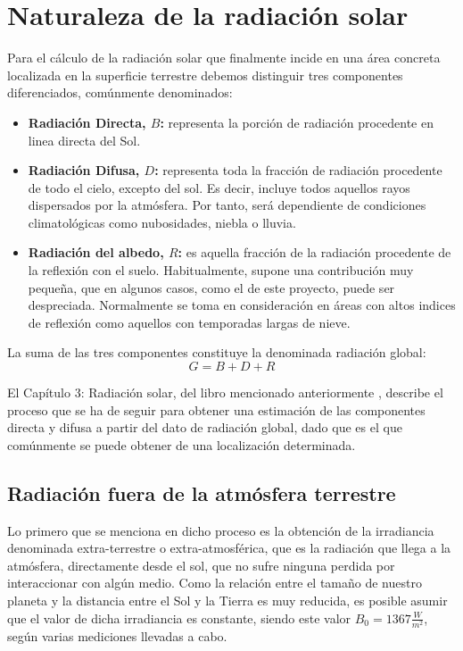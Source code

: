 \section{Naturaleza de la radiación solar}

Para el cálculo de la radiación solar que finalmente incide en una área concreta localizada en la superficie terrestre debemos distinguir tres componentes diferenciados, comúnmente denominados:

\begin{itemize}
\item \textbf{ Radiación Directa, $B$:} representa la porción de radiación procedente en linea directa del Sol.
\item \textbf{Radiación Difusa, $D$:} representa toda la fracción  de radiación procedente de todo el cielo, excepto del sol. Es decir, incluye todos aquellos rayos dispersados por la atmósfera. Por tanto, será dependiente de condiciones climatológicas como nubosidades, niebla o lluvia.
\item \textbf{Radiación del albedo, $R$:} es aquella fracción de la radiación procedente de la reflexión con el suelo. Habitualmente, supone una contribución muy pequeña, que en algunos casos, como el de este proyecto, puede ser despreciada. Normalmente se toma en consideración en áreas con altos indices de reflexión como aquellos con temporadas largas de nieve.
\end{itemize}

La suma de las tres componentes constituye la denominada radiación global:
\begin{equation}
G=B+D+R
\end{equation}
\label{equation:eqn_global_radiation}

El Capítulo 3: Radiación solar, del libro mencionado anteriormente \cite{esf_book}, describe el proceso que se ha de seguir para obtener una estimación de las componentes directa y difusa a partir del dato de radiación global, dado que es el que comúnmente se puede obtener de una localización determinada.

\subsection{Radiación fuera de la atmósfera terrestre}
\label{section:extra-irrad}

Lo primero que se menciona en dicho proceso es la obtención de la irradiancia denominada extra-terrestre o extra-atmosférica, que es la radiación que llega a la atmósfera, directamente desde el sol, que no sufre ninguna perdida por interaccionar con algún medio. Como la relación entre el tamaño de nuestro planeta y la distancia entre el Sol y la Tierra es muy reducida, es posible asumir que el valor de dicha irradiancia es constante, siendo este valor $B_0 = 1367 \frac{W}{m^2}$, según varias mediciones llevadas a cabo.

